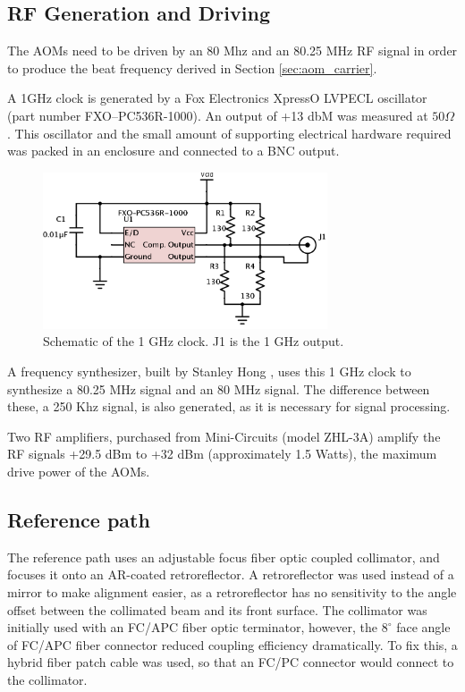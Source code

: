 \subsection{RF Generation and Driving}

The AOMs need to be driven by an 80 Mhz and an 80.25 MHz RF signal in order to produce the beat frequency derived in Section \ref{sec:aom_carrier}.

A 1GHz clock is generated by a Fox Electronics XpressO LVPECL oscillator (part number FXO–PC536R-1000). An output of +13 dbM was measured at $50\Omega$. This oscillator and the small amount of supporting electrical hardware required was packed in an enclosure and connected to a BNC output.

\begin{figure}[h!]
\centering
\includegraphics[width=0.75\textwidth]{Images/Schematics/1ghzclock_2.png}
\caption{Schematic of the 1 GHz clock. J1 is the 1 GHz output.}
\end{figure}

A frequency synthesizer, built by Stanley Hong \cite{hong}, uses this 1 GHz clock to synthesize a 80.25 MHz signal and an 80 MHz signal. The difference between these, a 250 Khz signal, is also generated, as it is necessary for signal processing.

Two RF amplifiers, purchased from Mini-Circuits (model ZHL-3A) amplify the RF signals +29.5 dBm to +32 dBm (approximately 1.5 Watts), the maximum drive power of the AOMs.

\subsection{Reference path}


The reference path uses an adjustable focus fiber optic coupled collimator, and focuses it onto an AR-coated retroreflector. A retroreflector was used instead of a mirror to make alignment easier, as a retroreflector has no sensitivity to the angle offset between the collimated beam and its front surface. The collimator was initially used with an FC/APC fiber optic terminator, however, the $8^{\circ}$ face angle of FC/APC fiber connector reduced coupling efficiency dramatically. To fix this, a hybrid fiber patch cable was used, so that an FC/PC connector would connect to the collimator.

